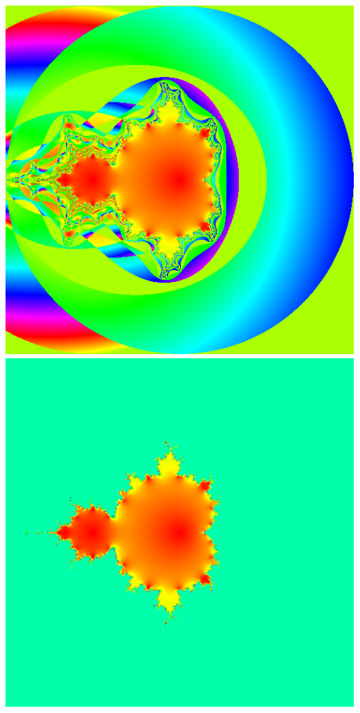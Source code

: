 \documentclass[../resume.tex]{subfiles}
\begin{document}
\includegraphics[scale=0.15]{../TAing/mandel/7.png}
\includegraphics[scale=0.15]{../TAing/mandel/8.png}
\end{document}
